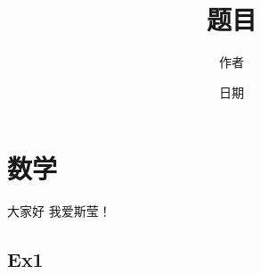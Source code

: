 \documentclass[12pt]{article}
\title{题目}
\author{作者}
\date{日期}
\begin{document}
\maketitle

\begin{abstract}

\end{abstract}


\section{数学}
大家好 我爱斯莹！

\subsection{Ex1}
\end{document}
